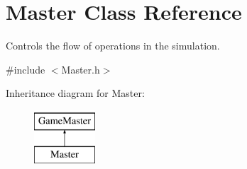 \hypertarget{class_master}{}\section{Master Class Reference}
\label{class_master}


Controls the flow of operations in the simulation.  




{\ttfamily \#include $<$Master.\+h$>$}

Inheritance diagram for Master\+:\begin{figure}[H]
\begin{center}
\leavevmode
\includegraphics[height=2.000000cm]{class_master}
\end{center}
\end{figure}
